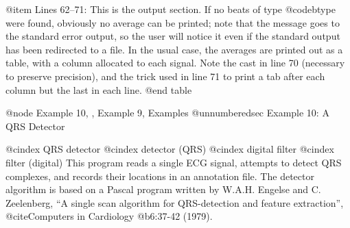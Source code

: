 {{{{{{{{{@item Lines 62--71:
This is the output section.  If no beats of type @code{btype} were
found, obviously no average can be printed; note that the message goes
to the standard error output, so the user will notice it even if the
standard output has been redirected to a file.  In the usual case, the
averages are printed out as a table, with a column allocated to each
signal.  Note the cast in line 70 (necessary to preserve precision), and
the trick used in line 71 to print a tab after each column but the last
in each line.
@end table

@node     Example 10, , Example 9, Examples
@unnumberedsec Example 10: A QRS Detector

@cindex QRS detector
@cindex detector (QRS)
@cindex digital filter
@cindex filter (digital)
This program reads a single ECG signal, attempts to detect QRS complexes,
and records their locations in an annotation file.  The detector algorithm
is based on a Pascal program written by W.A.H. Engelse and C. Zeelenberg,
``A single scan algorithm for QRS-detection and feature extraction'',
@cite{Computers in Cardiology} @b{6}:37-42 (1979).

}}}}}}}}}
